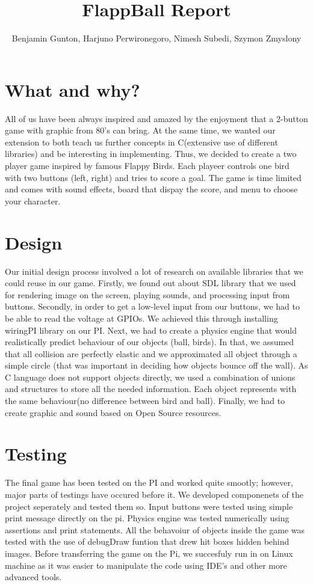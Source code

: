 \documentclass[11pt]{article}
\begin{document}
\title{FlappBall Report}
\author{Benjamin Gunton, Harjuno Perwironegoro, Nimesh Subedi, Szymon Zmyslony}

\maketitle

\section{What and why?}
All of us have been always inspired and amazed by the enjoyment that a 2-button game with graphic from 80's can bring. At the same time, we wanted our extension to both teach us further concepts in C(extensive use of different libraries) and be interesting in implementing. Thus, we decided to create a two player game inspired by famous Flappy Birds. Each playeer controls one bird with two buttons (left, right) and tries to score a goal. The game is time limited and comes with sound effects, board that dispay the score, and menu to choose your character.
\section{Design}
Our initial design process involved a lot of research on available libraries that we could reuse in our game. Firstly, we found out about SDL library that we used for rendering image on the screen, playing sounds, and processing input from buttons. 
Secondly, in order to get a low-level input from our buttons, we had to be able to read the voltage at GPIOs. We achieved this through installing wiringPI library on our PI. Next, we had to create a physics engine that would realistically predict behaviour of our objects (ball, birds). In that, we assumed that all collision are perfectly elastic and we approximated all object through a simple circle (that was important in deciding how objects bounce off the wall). As C language does not support objects directly, we used a combination of unions and structures to store all the needed information. Each object represents with the same behaviour(no difference between bird and ball). Finally, we had to create graphic and sound based on Open Source resources.



\section{Testing}
The final game has been tested on the PI and worked quite smootly; however, major parts of testings have occured before it. We developed componenets of the project seperately and tested them so. Input buttons were tested using simple print message directly on the pi. Physics engine was tested numerically using assertions and print statements. All the behavoiur of objects inside the game was tested with the use of debugDraw funtion that drew hit boxes hidden behind images. Before transferring the game on the Pi, we succesfuly run in on Linux machine as it was easier to manipulate the code using IDE's and other more advanced tools. 
\end{document}
